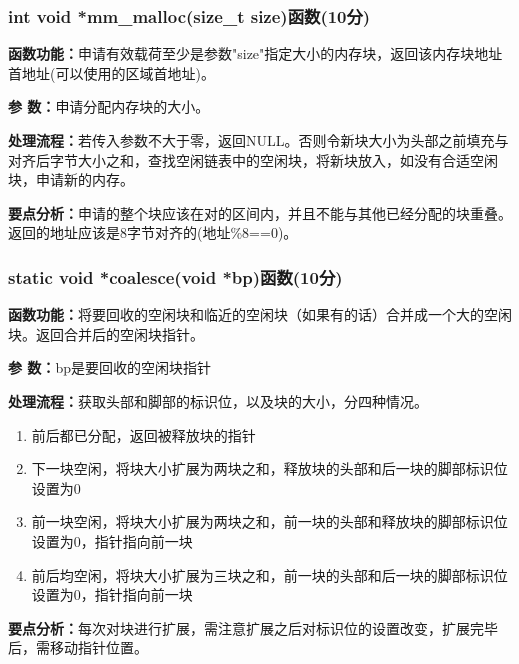 \subsubsection{int void *mm\_malloc(size\_t size)函数(10分)}
\textbf{函数功能：}申请有效载荷至少是参数"size"指定大小的内存块，返回该内存块地址首地址(可以使用的区域首地址)。

\textbf{参   数：}申请分配内存块的大小。

\textbf{处理流程：}若传入参数不大于零，返回NULL。否则令新块大小为头部之前填充与对齐后字节大小之和，查找空闲链表中的空闲块，将新块放入，如没有合适空闲块，申请新的内存。

\textbf{要点分析：}申请的整个块应该在对的区间内，并且不能与其他已经分配的块重叠。返回的地址应该是8字节对齐的(地址\%8==0)。
\subsubsection{static void *coalesce(void *bp)函数(10分)}
\textbf{函数功能：}将要回收的空闲块和临近的空闲块（如果有的话）合并成一个大的空闲块。返回合并后的空闲块指针。

\textbf{参   数：}bp是要回收的空闲块指针

\textbf{处理流程：}获取头部和脚部的标识位，以及块的大小，分四种情况。
\begin{enumerate}
    \item 前后都已分配，返回被释放块的指针
    \item 下一块空闲，将块大小扩展为两块之和，释放块的头部和后一块的脚部标识位设置为0
    \item 前一块空闲，将块大小扩展为两块之和，前一块的头部和释放块的脚部标识位设置为0，指针指向前一块
    \item 前后均空闲，将块大小扩展为三块之和，前一块的头部和后一块的脚部标识位设置为0，指针指向前一块
\end{enumerate}

\textbf{要点分析：}每次对块进行扩展，需注意扩展之后对标识位的设置改变，扩展完毕后，需移动指针位置。